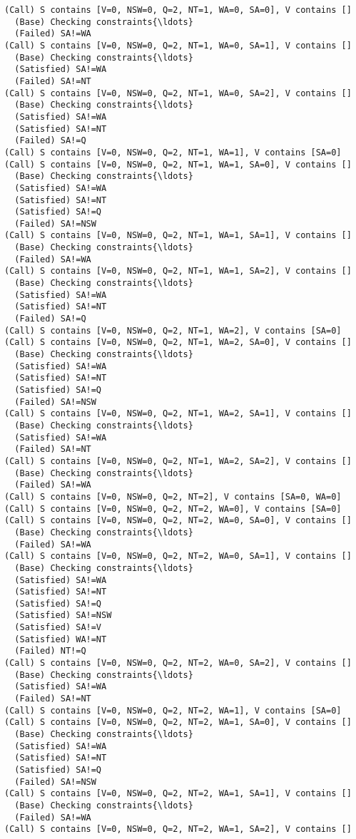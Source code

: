 \documentclass[11pt]{article}
\begin{document}
\begin{Verbatim}[commandchars=\\\{\}]
(Call) S contains [V=0, NSW=0, Q=2, NT=1, WA=0, SA=0], V contains []
  (Base) Checking constraints{\ldots}
  (Failed) SA!=WA
(Call) S contains [V=0, NSW=0, Q=2, NT=1, WA=0, SA=1], V contains []
  (Base) Checking constraints{\ldots}
  (Satisfied) SA!=WA
  (Failed) SA!=NT
(Call) S contains [V=0, NSW=0, Q=2, NT=1, WA=0, SA=2], V contains []
  (Base) Checking constraints{\ldots}
  (Satisfied) SA!=WA
  (Satisfied) SA!=NT
  (Failed) SA!=Q
(Call) S contains [V=0, NSW=0, Q=2, NT=1, WA=1], V contains [SA=0]
(Call) S contains [V=0, NSW=0, Q=2, NT=1, WA=1, SA=0], V contains []
  (Base) Checking constraints{\ldots}
  (Satisfied) SA!=WA
  (Satisfied) SA!=NT
  (Satisfied) SA!=Q
  (Failed) SA!=NSW
(Call) S contains [V=0, NSW=0, Q=2, NT=1, WA=1, SA=1], V contains []
  (Base) Checking constraints{\ldots}
  (Failed) SA!=WA
(Call) S contains [V=0, NSW=0, Q=2, NT=1, WA=1, SA=2], V contains []
  (Base) Checking constraints{\ldots}
  (Satisfied) SA!=WA
  (Satisfied) SA!=NT
  (Failed) SA!=Q
(Call) S contains [V=0, NSW=0, Q=2, NT=1, WA=2], V contains [SA=0]
(Call) S contains [V=0, NSW=0, Q=2, NT=1, WA=2, SA=0], V contains []
  (Base) Checking constraints{\ldots}
  (Satisfied) SA!=WA
  (Satisfied) SA!=NT
  (Satisfied) SA!=Q
  (Failed) SA!=NSW
(Call) S contains [V=0, NSW=0, Q=2, NT=1, WA=2, SA=1], V contains []
  (Base) Checking constraints{\ldots}
  (Satisfied) SA!=WA
  (Failed) SA!=NT
(Call) S contains [V=0, NSW=0, Q=2, NT=1, WA=2, SA=2], V contains []
  (Base) Checking constraints{\ldots}
  (Failed) SA!=WA
(Call) S contains [V=0, NSW=0, Q=2, NT=2], V contains [SA=0, WA=0]
(Call) S contains [V=0, NSW=0, Q=2, NT=2, WA=0], V contains [SA=0]
(Call) S contains [V=0, NSW=0, Q=2, NT=2, WA=0, SA=0], V contains []
  (Base) Checking constraints{\ldots}
  (Failed) SA!=WA
(Call) S contains [V=0, NSW=0, Q=2, NT=2, WA=0, SA=1], V contains []
  (Base) Checking constraints{\ldots}
  (Satisfied) SA!=WA
  (Satisfied) SA!=NT
  (Satisfied) SA!=Q
  (Satisfied) SA!=NSW
  (Satisfied) SA!=V
  (Satisfied) WA!=NT
  (Failed) NT!=Q
(Call) S contains [V=0, NSW=0, Q=2, NT=2, WA=0, SA=2], V contains []
  (Base) Checking constraints{\ldots}
  (Satisfied) SA!=WA
  (Failed) SA!=NT
(Call) S contains [V=0, NSW=0, Q=2, NT=2, WA=1], V contains [SA=0]
(Call) S contains [V=0, NSW=0, Q=2, NT=2, WA=1, SA=0], V contains []
  (Base) Checking constraints{\ldots}
  (Satisfied) SA!=WA
  (Satisfied) SA!=NT
  (Satisfied) SA!=Q
  (Failed) SA!=NSW
(Call) S contains [V=0, NSW=0, Q=2, NT=2, WA=1, SA=1], V contains []
  (Base) Checking constraints{\ldots}
  (Failed) SA!=WA
(Call) S contains [V=0, NSW=0, Q=2, NT=2, WA=1, SA=2], V contains []

\end{Verbatim}
\end{document}
